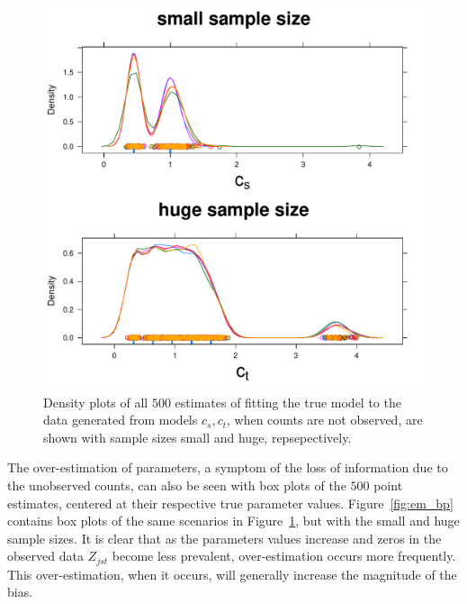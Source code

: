 

\begin{figure}
  \centering
  \includegraphics[scale=0.5]{em}
  \caption{Density plots of all $500$ estimates of fitting the true model to the data generated from models $c_s,c_t$, when counts are not observed, are shown with sample sizes small and huge, repsepectively.}
  \label{fig:em}
\end{figure}

The over-estimation of parameters, a symptom of the loss of information due to the unobserved counts, can also be seen with box plots of the $500$ point estimates, centered at their respective true parameter values.  Figure~\ref{fig:em_bp} contains box plots of the same scenarios in Figure~\ref{fig:em}, but with the small and huge sample sizes.  It is clear that as the parameters values increase and zeros in the observed data $Z_{jst}$ become less prevalent, over-estimation occurs more frequently.  This over-estimation, when it occurs, will generally increase the magnitude of the bias.



